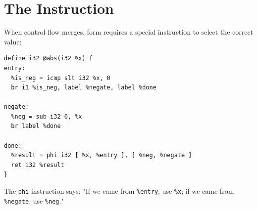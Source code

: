 \section{The  Instruction}

When control flow merges,  form requires a special instruction to select the correct value:

\begin{lstlisting}[style=ir]
define i32 @abs(i32 %x) {
entry:
  %is_neg = icmp slt i32 %x, 0
  br i1 %is_neg, label %negate, label %done

negate:
  %neg = sub i32 0, %x
  br label %done

done:
  %result = phi i32 [ %x, %entry ], [ %neg, %negate ]
  ret i32 %result
}
\end{lstlisting}

The \texttt{phi} instruction says: "If we came from \texttt{\%entry}, use \texttt{\%x}; if we came from \texttt{\%negate}, use \texttt{\%neg}."
